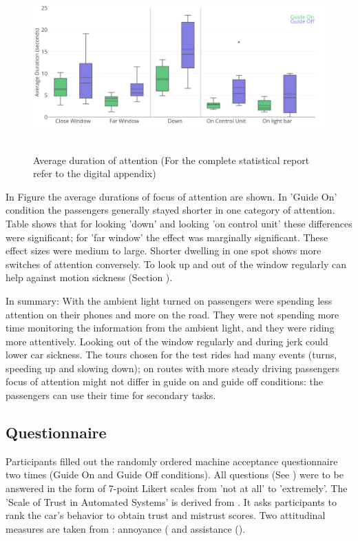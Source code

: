 \begin{figure}
    \includegraphics[width=1\textwidth]{fig/Average.png}\hfill\
    \caption[Average Duration of Attention]{Average duration of attention (For the complete statistical report refer to the digital appendix)}
    \label{fig:attentionAverage}
\end{figure}


In Figure  the average durations of focus of attention are shown. In 'Guide On' condition the passengers generally stayed shorter in one category of attention. Table  shows that for looking 'down' and looking 'on control unit' these differences were significant; for 'far window' the effect was marginally significant. These effect sizes were medium to large. Shorter dwelling in one spot shows more switches of attention conversely. To look up and out of the window regularly can help against motion sickness (Section ). 

In summary: With the ambient light turned on passengers were spending less attention on their phones and more on the road. They were not spending more time monitoring the information from the ambient light, and they were riding more attentively. Looking out of the window regularly and during jerk could lower car sickness. The tours chosen for the test rides had many events (turns, speeding up and slowing down); on routes with more steady driving passengers focus of attention might not differ in guide on and guide off conditions: the passengers can use their time for secondary tasks. 

\subsection{Questionnaire}
\label{ssec:questionaire}
Participants filled out the randomly ordered machine acceptance questionnaire two times (Guide On and Guide Off conditions). All questions (See  ) were to be answered in the form of 7-point Likert scales from 'not at all' to 'extremely'. The 'Scale of Trust in Automated Systems' is derived from \cite{Jian2010}. It asks participants to rank the car's behavior to obtain trust and mistrust scores. Two attitudinal measures are taken from \cite{Koo2015}: annoyance ( and assistance (). 

